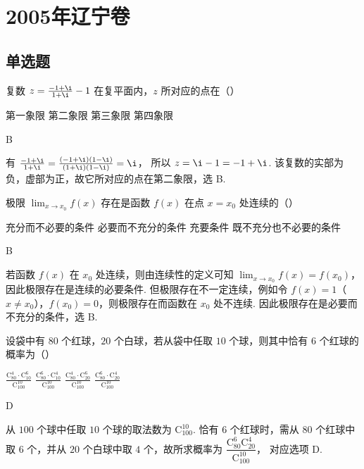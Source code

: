 \chapter{2005年辽宁卷}
\section{单选题}
\begin{problem}
复数 \(z = \frac{-1 + \i}{1 + \i} - 1\) 在复平面内，\(z\) 所对应的点在（\quad）

\choices
    {第一象限}
    {第二象限}
    {第三象限}
    {第四象限}

\begin{answer}
B
\end{answer}

\begin{solution}
有
\(\frac{-1+\i}{1+\i}=\frac{(-1+\i)(1-\i)}{(1+\i)(1-\i)}=\i\)，
所以 \(z=\i-1=-1+\i\). 该复数的实部为负，虚部为正，故它所对应的点在第二象限，选 B.
\end{solution}
\end{problem}

\begin{problem}
极限 \(\displaystyle\lim_{x \to x_0} f(x)\) 存在是函数 \(f(x)\) 在点 \(x = x_0\) 处连续的（\quad）

\choices
    {充分而不必要的条件}
    {必要而不充分的条件}
    {充要条件}
    {既不充分也不必要的条件}

\begin{answer}
B
\end{answer}

\begin{solution}
若函数 \(f(x)\) 在 \(x_0\) 处连续，则由连续性的定义可知 \(\displaystyle\lim_{x\to x_0}f(x)=f(x_0)\)，因此极限存在是连续的必要条件. 但极限存在不一定连续，例如令 \(f(x)=1\)（\(x\ne x_0\)），\(f(x_0)=0\)，则极限存在而函数在 \(x_0\) 处不连续. 因此极限存在是必要而不充分的条件，选 B.
\end{solution}
\end{problem}

\begin{problem}
设袋中有 \(80\) 个红球，\(20\) 个白球，若从袋中任取 \(10\) 个球，则其中恰有 \(6\) 个红球的概率为（\quad）

\choices
    {\(\frac{\mathrm C_{80}^{4}\cdot \mathrm C_{10}^{6}}{\mathrm C_{100}^{10}}\)}
    {\(\frac{\mathrm C_{80}^{6}\cdot \mathrm C_{10}^{4}}{\mathrm C_{100}^{10}}\)}
    {\(\frac{\mathrm C_{80}^{4}\cdot \mathrm C_{20}^{6}}{\mathrm C_{100}^{10}}\)}
    {\(\frac{\mathrm C_{80}^{6}\cdot \mathrm C_{20}^{4}}{\mathrm C_{100}^{10}}\)}

\begin{answer}
D
\end{answer}

\begin{solution}
从 \(100\) 个球中任取 \(10\) 个球的取法数为 \(\mathrm C_{100}^{10}\). 恰有 \(6\) 个红球时，需从 \(80\) 个红球中取 \(6\) 个，并从 \(20\) 个白球中取 \(4\) 个，故所求概率为
\(\dfrac{\mathrm C_{80}^{6}\mathrm C_{20}^{4}}{\mathrm C_{100}^{10}}\)，
对应选项 D.
\end{solution}
\end{problem}

